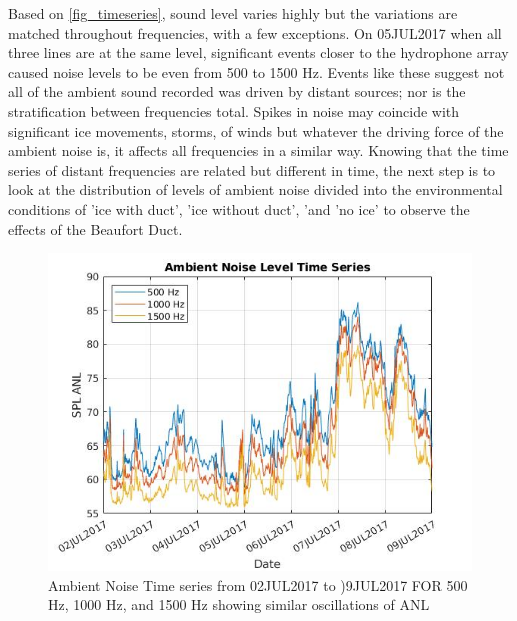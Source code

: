 Based on \autoref{fig_timeseries}, sound level varies highly but the variations are matched throughout frequencies, with a few exceptions. On 05JUL2017 when all three lines are at the same level, significant events closer to the hydrophone array caused noise levels to be even from 500 to 1500 Hz. Events like these suggest not all of the ambient sound recorded was driven by distant sources; nor is the stratification between frequencies total. Spikes in noise may coincide with significant ice movements, storms, of winds but whatever the driving force of the ambient noise is, it affects all frequencies in a similar way. Knowing that the time series of distant frequencies are related but different in time, the next step is to look at the distribution of levels of ambient noise divided into the environmental conditions of 'ice with duct', 'ice without duct', 'and 'no ice' to observe the effects of the Beaufort Duct.


\begin{figure}[ht]
\centering
\includegraphics[scale=0.6]{Figures/timeseries_500_1500_july_overlay.jpg}
\caption{Ambient Noise Time series from 02JUL2017 to )9JUL2017 FOR 500 Hz, 1000 Hz, and 1500 Hz showing similar oscillations of ANL}
\label{fig_timeseries}
\end{figure}





